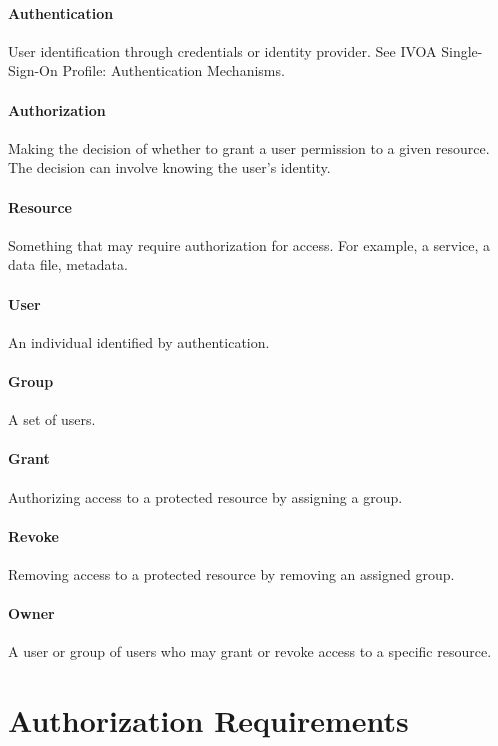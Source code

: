 \documentclass[11pt,a4paper]{ivoa}
\begin{document}
\paragraph{Authentication} User identification through credentials or identity provider.  See IVOA Single-Sign-On Profile: Authentication Mechanisms.  \citep{std:SSOAUTH}

\paragraph{Authorization} Making the decision of whether to grant a user permission to a given resource.  The decision can involve knowing the user's identity.

\paragraph{Resource} Something that may require authorization for access.  For example, a service, a data file, metadata.

\paragraph{User} An individual identified by authentication.

\paragraph{Group} A set of users.

\paragraph{Grant} Authorizing access to a protected resource by assigning a group.

\paragraph{Revoke} Removing access to a protected resource by removing an assigned group.

\paragraph{Owner} A user or group of users who may grant or revoke access to a specific resource.

\section{Authorization Requirements}
\end{document}

